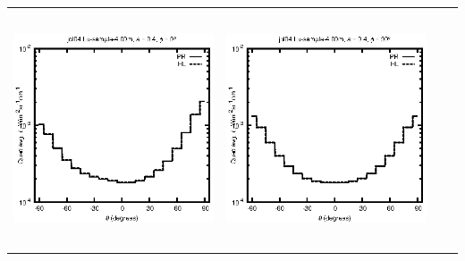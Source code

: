 \begin{tabular}{c c c c}
\includegraphics[height=7cm]{../eps/jol04_Lu_sample_4.00m_fwd.eps} &
\includegraphics[height=7cm]{../eps/jol04_Lu_sample_4.00m_cross.eps} \\
\end{tabular}

\pagebreak

